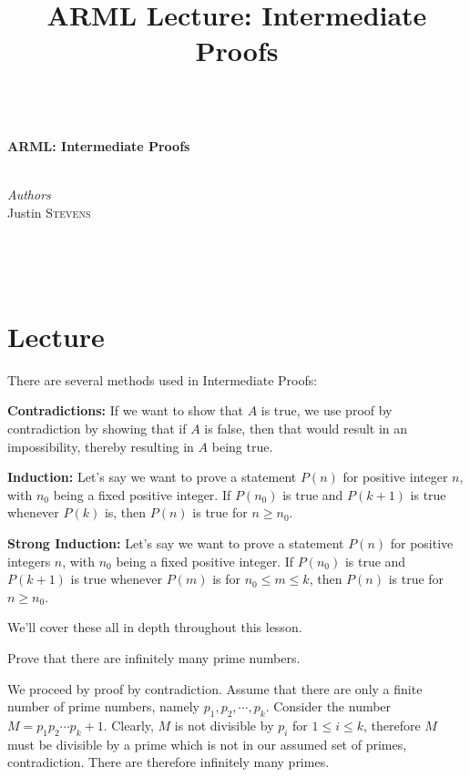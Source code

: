 
\title{ARML Lecture:  Intermediate Proofs}

\begin{center}
\HRule \\[0.4cm]
{ \huge \bfseries ARML: Intermediate Proofs}\\[0.4cm] %
\HRule \\[1.5cm]
\begin{minipage}{0.4\textwidth}
\begin{flushleft} \large
\emph{Authors}\\
Justin \textsc{Stevens} \newline
\end{flushleft}
\end{minipage}
~
\begin{minipage}{0.4\textwidth}
\begin{flushright} \large

\end{flushright}
\end{minipage}\\[0.5cm]
\end{center}

\section{Lecture}

There are several methods used in Intermediate Proofs:  

\textbf{Contradictions:}  If we want to show that $A$ is true, we use proof by contradiction by showing that if $A$ is false, then that would result in an impossibility, thereby resulting in $A$ being true.  

\textbf{Induction:}  Let's say we want to prove a statement $P(n)$ for positive integer $n$, with $n_0$ being a fixed positive integer.  If $P(n_0)$ is true and $P(k+1)$ is true whenever $P(k)$ is, then $P(n)$ is true for $n\ge n_0$.  

\textbf{Strong Induction:}  Let's say we want to prove a statement $P(n)$ for positive integers $n$, with $n_0$ being a fixed positive integer.  If $P(n_0)$ is true and $P(k+1)$ is true whenever $P(m)$ is for $n_0 \le m\le k$, then $P(n)$ is true for $n\ge n_0$.

We'll cover these all in depth throughout this lesson.

\begin{exmp}  Prove that there are infinitely many prime numbers. \end{exmp}
\begin{soln}  We proceed by proof by contradiction.  Assume that there are only a finite number of prime numbers, namely $p_1, p_2, \cdots, p_k$.  Consider the number $M=p_1p_2\cdots p_k+1$.  Clearly, $M$ is not divisible by $p_i$ for $1\le i\le k$, therefore $M$ must be divisible by a prime which is not in our assumed set of primes, contradiction.  There are therefore infinitely many primes.  \end{soln}


